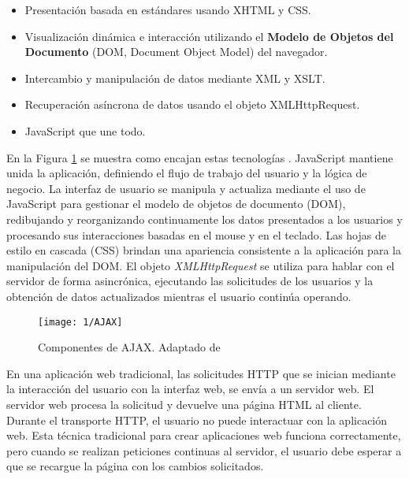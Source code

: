 \begin{itemize}
    \item Presentación basada en estándares usando XHTML y CSS.
    \item Visualización dinámica e interacción utilizando el \textbf{Modelo de Objetos del Documento} (\gls{DOM}, Document Object Model) del navegador. 
	\item  Intercambio y manipulación de datos mediante XML y XSLT.
	\item Recuperación asíncrona de datos usando el objeto \gls{XMLHttpRequest}.
	\item JavaScript que une todo.
\end{itemize}
En la Figura \ref{fig:AJAX} se muestra como encajan estas tecnologías \cite{Crane2005}.  JavaScript  mantiene unida la aplicación, definiendo el flujo de trabajo del usuario y la lógica de negocio. La interfaz de usuario se manipula y actualiza
mediante el uso de JavaScript para gestionar el modelo de objetos de documento (DOM), redibujando y reorganizando continuamente los datos presentados a los usuarios y procesando sus interacciones basadas en el mouse y en el teclado. Las hojas de estilo en cascada (CSS) brindan una apariencia consistente a la aplicación  para la manipulación  del DOM. El objeto \textit{XMLHttpRequest}  se utiliza para hablar con el servidor de forma asincrónica, ejecutando las solicitudes de los usuarios y la obtención de datos actualizados mientras el usuario continúa operando. 

 \begin{figure} %
 			\begin{center}
	\texttt{[image: 1/AJAX]}
	\caption{Componentes de AJAX. Adaptado de \cite{Crane2005}}
	\label{fig:AJAX}
		\end{center}
\end{figure}


En una aplicación web tradicional, las solicitudes HTTP que se inician mediante la interacción del usuario con la interfaz web, se envía a un servidor web. El servidor web procesa la solicitud y devuelve una página HTML al cliente. Durante el transporte HTTP, el usuario no puede interactuar con la aplicación web.
Esta técnica tradicional para crear aplicaciones web funciona correctamente, pero cuando se realizan peticiones continuas al servidor, el usuario debe esperar a que se recargue la página con los cambios solicitados.

